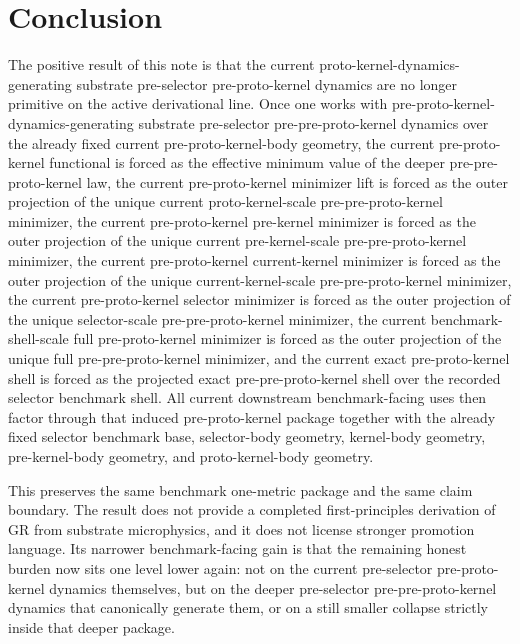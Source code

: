 \documentclass[11pt]{article}
\begin{document}
\section{Conclusion}

The positive result of this note is that the current proto-kernel-dynamics-generating substrate pre-selector pre-proto-kernel dynamics are no longer primitive on the active derivational line. Once one works with pre-proto-kernel-dynamics-generating substrate pre-selector pre-pre-proto-kernel dynamics over the already fixed current pre-proto-kernel-body geometry, the current pre-proto-kernel functional is forced as the effective minimum value of the deeper pre-pre-proto-kernel law, the current pre-proto-kernel minimizer lift is forced as the outer projection of the unique current proto-kernel-scale pre-pre-proto-kernel minimizer, the current pre-proto-kernel pre-kernel minimizer is forced as the outer projection of the unique current pre-kernel-scale pre-pre-proto-kernel minimizer, the current pre-proto-kernel current-kernel minimizer is forced as the outer projection of the unique current-kernel-scale pre-pre-proto-kernel minimizer, the current pre-proto-kernel selector minimizer is forced as the outer projection of the unique selector-scale pre-pre-proto-kernel minimizer, the current benchmark-shell-scale full pre-proto-kernel minimizer is forced as the outer projection of the unique full pre-pre-proto-kernel minimizer, and the current exact pre-proto-kernel shell is forced as the projected exact pre-pre-proto-kernel shell over the recorded selector benchmark shell. All current downstream benchmark-facing uses then factor through that induced pre-proto-kernel package together with the already fixed selector benchmark base, selector-body geometry, kernel-body geometry, pre-kernel-body geometry, and proto-kernel-body geometry.

This preserves the same benchmark one-metric package and the same claim boundary. The result does not provide a completed first-principles derivation of GR from substrate microphysics, and it does not license stronger promotion language. Its narrower benchmark-facing gain is that the remaining honest burden now sits one level lower again: not on the current pre-selector pre-proto-kernel dynamics themselves, but on the deeper pre-selector pre-pre-proto-kernel dynamics that canonically generate them, or on a still smaller collapse strictly inside that deeper package.
\end{document}
